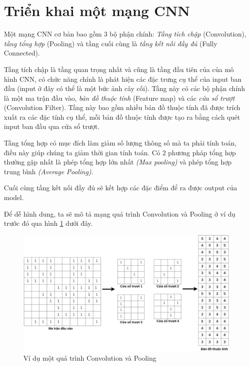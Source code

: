 \section{Triển khai một mạng CNN}
\hspace{\parindent} Một mạng CNN cơ bản bao gồm 3 bộ phận chính: \textit{Tầng tích chập} (Convolution),  \textit{tầng tổng hợp} (Pooling) và tầng cuối cùng là \textit{tầng kết nối đầy đủ} (Fully Connected).

Tầng tích chập là tầng quan trọng nhất và cũng là tầng đầu tiên của của mô hình CNN, có chức năng chính là phát hiện các đặc trưng cụ thể của input ban đầu (input ở đây có thể là một bức ảnh cây cối). Tầng này có các bộ phận chính là một ma trận đầu vào, \textit{bản đồ thuộc tính} (Feature map) và các \textit{cửa sổ trượt} (Convolution Filter). Tầng này bao gồm nhiều bản đồ thuộc tính đã được trích xuất ra các đặc tính cụ thể, mỗi bản đồ thuộc tính được tạo ra bằng cách quét input ban đầu qua cửa sổ trượt.

Tầng tổng hợp có mục đích làm giảm số lượng thông số mà ta phải tính toán, điều này giúp chúng ta giảm thời gian tính toán. Có 2 phương pháp tổng hợp thường gặp nhất là phép tổng hợp lớn nhất \textit{(Max pooling)} và phép tổng hợp trung bình \textit{(Average Pooling)}.

Cuối cùng tầng kết nối đầy đủ sẽ kết hợp các đặc điểm để ra được output của model.

Để dễ hình dung, ta sẽ mô tả mạng quá trình Convolution và Pooling ở ví dụ trước đó qua hình \ref{fig:convolutionexample7} dưới đây.

\begin{figure}[!h]
	\centering
		\includegraphics[width=1\columnwidth]{books/artificial-neural-network/chapter05/figure/convolution-example-7.jpg}
        \caption{Ví dụ một quá trình Convolution và Pooling}
        \label{fig:convolutionexample7}
\end{figure}

